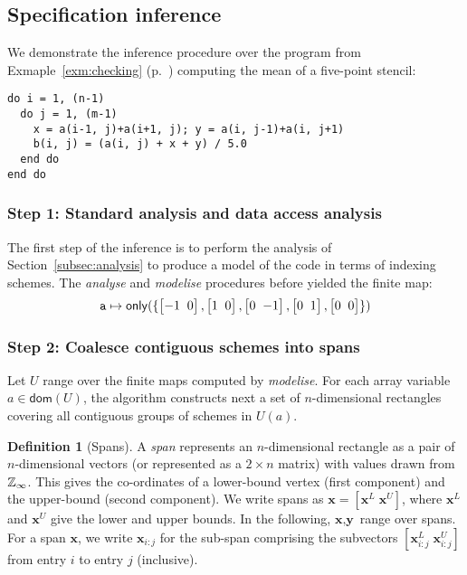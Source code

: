 \documentclass[10pt,preprint]{sigplanconf}
\newcounter{block}
\theoremstyle{definition}
\newtheorem{definition}[block]{Definition}
\newcommand{\vect}[1]{\textbf{#1}}
\newcommand{\vtwoh}[2]{\setlength{\arraycolsep}{0em}
\left[\begin{array}{cc}#1 \; & \; #2\end{array}\right]}
\begin{document}
\subsection{Specification inference}
\label{subsec:inference}

We demonstrate the inference procedure over the
 program from Exmaple~\ref{exm:checking} (p.~\pageref{exm:checking})
 computing the mean of a five-point stencil:
\begin{verbatim}
do i = 1, (n-1)
  do j = 1, (m-1)
    x = a(i-1, j)+a(i+1, j); y = a(i, j-1)+a(i, j+1)
    b(i, j) = (a(i, j) + x + y) / 5.0
  end do
end do
\end{verbatim}
%
\subsubsection{Step 1: Standard analysis and data access analysis}
\label{sec:inf-step1}

The first step of the inference is to perform the
analysis of Section~\ref{subsec:analysis} to produce a
model of the code in terms of indexing schemes.
The \emph{analyse} and \emph{modelise} procedures before yielded the finite map:
%
\begin{align*}
\texttt{a} \mapsto \mathsf{only}(\{\vtwoh{-1}{0}, \vtwoh{1}{0},
          \vtwoh{0}{-1}, \vtwoh{0}{1}, \vtwoh{0}{0}\})
\end{align*}
%

\subsubsection{Step 2: Coalesce contiguous schemes into spans}
\label{sec:inf-step3}

Let $U$ range over the finite maps computed by \textit{modelise}.  For
each array variable $a \in \mathsf{dom}(U)$, the algorithm constructs next a set of
$n$-dimensional rectangles covering all contiguous groups of schemes
in $U(a)$.

\newcommand{\spanOp}{\textsf{spans}}

\begin{definition}[Spans]
  A \emph{span} represents an $n$-dimensional rectangle
  as a pair of $n$-dimensional vectors (or
  represented as a $2 \times n$ matrix) with values drawn from
  $\mathbb{Z}_\infty{}$. This gives the co-ordinates of a lower-bound vertex
  (first component) and the upper-bound (second component). We write
  spans as $\vect{x} = [\vect{x}^L \; \vect{x}^U]$, where $\vect{x}^L$
  and $\vect{x}^U$ give the lower and upper bounds.  In
  the following, $\vect{x}, \vect{y}$ range over spans.  For a span
  $\vect{x}$, we write $\vect{x}_{i:j}$ for the sub-span comprising the
  subvectors $[\vect{x}^L_{i:j} \; \vect{x}^U_{i:j}]$ from entry $i$
  to entry $j$ (inclusive).
\end{definition}
\end{document}
